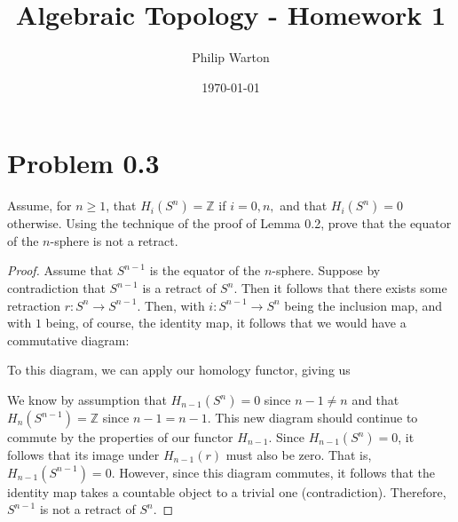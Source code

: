 \documentclass{article}
\theoremstyle{definition}
\begin{document}
\title{Algebraic Topology - Homework 1}
\author{Philip Warton}
\date{\today}
\maketitle
\section{Problem 0.3}
    \begin{mdframed}[]
        Assume, for $n \geq 1$, that $H_i(S^n) = \mathbb{Z}$ if $i = 0, n,$ and that $H_i(S^n) = 0$ otherwise.
        Using the technique of the proof of Lemma 0.2, prove that the equator of the $n$-sphere is not a retract.
    \end{mdframed}
    \begin{proof}
        Assume that $S^{n-1}$ is the equator of the $n$-sphere. Suppose by contradiction that $S^{n-1}$ is a 
        retract of $S^n$. Then it follows that there exists some retraction $r:S^n \rightarrow S^{n-1}$.
        Then, with $i:S^{n-1} \rightarrow S^n$ being the inclusion map, and with $1$ being, of course, the 
        identity map, it follows that we would have a commutative diagram:
        \begin{center}
        \end{center}
        To this diagram, we can apply our homology functor, giving us
        \begin{center}
        \end{center}
        We know by assumption that $H_{n-1}(S^n) = 0$ since $n-1 \neq n$ and that $H_n(S^{n-1}) = \mathbb{Z}$ since
        $n - 1 = n - 1$. This new diagram should continue to commute by the properties of our functor $H_{n-1}$.
        Since $H_{n-1}(S^n) = 0$, it follows that its image under $H_{n-1}(r)$ must also be zero. That is, $H_{n-1}(S^{n-1}) =0$.
        However, since this diagram commutes, it follows that the identity map takes a countable object to a trivial one (contradiction).
        Therefore, $S^{n-1}$ is not a retract of $S^n$.
    \end{proof}
\end{document}
